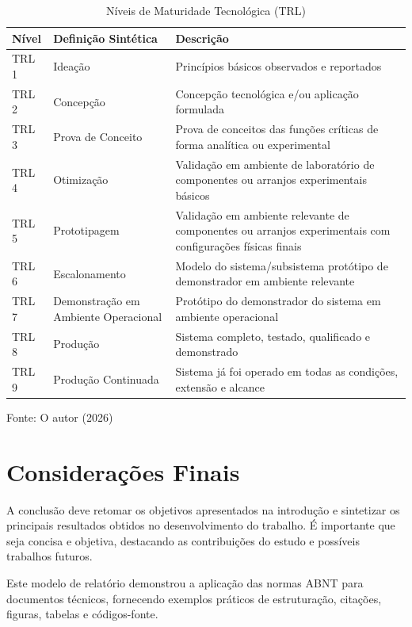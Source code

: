 \documentclass{classes/relatorio}
\begin{document}
\begin{table}[H]
    \centering
    \caption{Níveis de Maturidade Tecnológica (TRL)}
    \label{tab:trl}
    \small
    \begin{tabular}{p{1.5cm}p{2.5cm}p{7.5cm}}
        \hline
        \textbf{Nível} & \textbf{Definição Sintética} & \textbf{Descrição} \\
        \hline
        TRL 1 & Ideação & Princípios básicos observados e reportados \\
        \hline
        TRL 2 & Concepção & Concepção tecnológica e/ou aplicação formulada \\
        \hline
        TRL 3 & Prova de Conceito & Prova de conceitos das funções críticas de forma analítica ou experimental \\
        \hline
        TRL 4 & Otimização & Validação em ambiente de laboratório de componentes ou arranjos experimentais básicos \\
        \hline
        TRL 5 & Prototipagem & Validação em ambiente relevante de componentes ou arranjos experimentais com configurações físicas finais \\
        \hline
        TRL 6 & Escalonamento & Modelo do sistema/subsistema protótipo de demonstrador em ambiente relevante \\
        \hline
        TRL 7 & Demonstração em Ambiente Operacional & Protótipo do demonstrador do sistema em ambiente operacional \\
        \hline
        TRL 8 & Produção & Sistema completo, testado, qualificado e demonstrado \\
        \hline
        TRL 9 & Produção Continuada & Sistema já foi operado em todas as condições, extensão e alcance \\
        \hline
    \end{tabular}
    
    \vspace{0.3cm}
    {\fontsize{10pt}{\baselineskip}\selectfont
   Fonte: O autor (2026)}
\end{table}

\section{Considerações Finais}

A conclusão deve retomar os objetivos apresentados na introdução e sintetizar os principais resultados obtidos no desenvolvimento do trabalho. É importante que seja concisa e objetiva, destacando as contribuições do estudo e possíveis trabalhos futuros.

Este modelo de relatório demonstrou a aplicação das normas \cite{abntex2013} ABNT para documentos técnicos, fornecendo exemplos práticos de estruturação, citações, figuras, tabelas e códigos-fonte.




\end{document}
